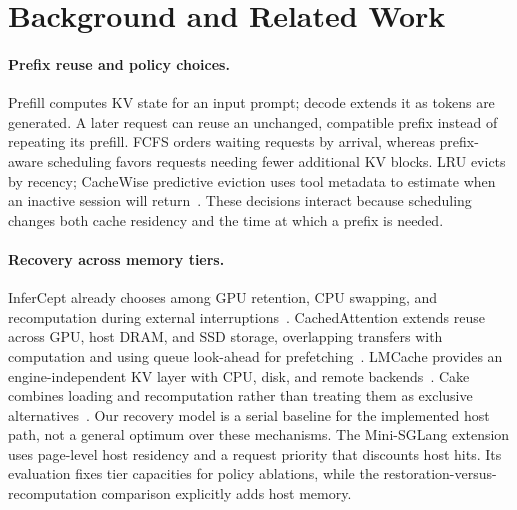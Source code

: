 \section{Background and Related Work}
\label{sec:related-work}

\paragraph{Prefix reuse and policy choices.}
Prefill computes KV state for an input prompt; decode extends it as tokens are generated.
A later request can reuse an unchanged, compatible prefix instead of repeating its prefill.
FCFS orders waiting requests by arrival, whereas prefix-aware scheduling favors requests needing fewer additional KV blocks.
LRU evicts by recency; CacheWise predictive eviction uses tool metadata to estimate when an inactive session will return~\cite{Tiwari2026CacheWise}.
These decisions interact because scheduling changes both cache residency and the time at which a prefix is needed.

\paragraph{Recovery across memory tiers.}
InferCept already chooses among GPU retention, CPU swapping, and recomputation during external interruptions~\cite{Abhyankar2024InferCept}.
CachedAttention extends reuse across GPU, host DRAM, and SSD storage, overlapping transfers with computation and using queue look-ahead for prefetching~\cite{Gao2024CachedAttention}.
LMCache provides an engine-independent KV layer with CPU, disk, and remote backends~\cite{Liu2025LMCache}.
Cake combines loading and recomputation rather than treating them as exclusive alternatives~\cite{Jin2025Cake}.
Our recovery model is a serial baseline for the implemented host path, not a general optimum over these mechanisms.
The Mini-SGLang extension uses page-level host residency and a request priority that discounts host hits.
Its evaluation fixes tier capacities for policy ablations, while the restoration-versus-recomputation comparison explicitly adds host memory.
